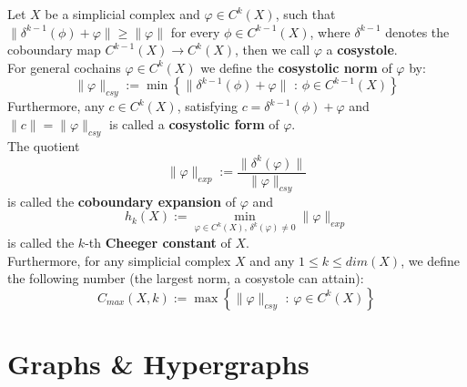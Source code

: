 Let \(X\) be a simplicial complex and \(\varphi\in C^k(X)\), such that \(\|\delta^{k-1}(\phi)+\varphi\|\geq\|\varphi\|\) for every \(\phi\in C^{k-1}(X)\), where \(\delta^{k-1}\) denotes the coboundary map \(C^{k-1}(X)\rightarrow C^k(X)\), then we call \(\varphi\) a \textbf{cosystole}.\\
For general cochains \(\varphi\in C^k(X)\) we define the \textbf{cosystolic norm} of \(\varphi\) by:
\[
\|\varphi\|_{csy}:=\min\left\{\|\delta^{k-1}(\phi)+\varphi\|\text{ : }\phi\in C^{k-1}(X)\right\}
\]
Furthermore, any \(c\in C^k(X)\), satisfying \(c=\delta^{k-1}(\phi)+\varphi\) and \(\|c\|=\|\varphi\|_{csy}\) is called a \textbf{cosystolic form} of \(\varphi\).\\
The quotient
\[
\|\varphi\|_{exp}:=\frac{\|\delta^k(\varphi)\|}{\|\varphi\|_{csy}}
\]
is called the \textbf{coboundary expansion} of \(\varphi\) and
\[
h_k(X):=\min\limits_{\varphi\in C^k(X)\text{, }\delta^k(\varphi)\neq 0}\|\varphi\|_{exp}
\]
is called the \(k\)-th \textbf{Cheeger constant} of \(X\).\\
Furthermore, for any simplicial complex \(X\) and any \(1\leq k\leq dim(X)\), we define the following number (the largest norm, a cosystole can attain):
\[
C_{max}(X,k):=\max\left\{\|\varphi\|_{csy}\text{ : }\varphi\in C^k(X)\right\}
\]

\section{Graphs \& Hypergraphs}

